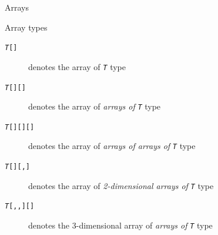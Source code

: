 \documentclass[presentation]{beamer}
\begin{document}
\begin{frame}{\dotnet Arrays}
    \begin{block}{Array types}
        \begin{description}
            \item[\texttt{\textit{T}\alert{[]}}] denotes the \alert{array of \texttt{\textit{T}}} type
            \item[\texttt{\textit{T}\alert{[][]}}] denotes the \alert{array of \emph{arrays of} \texttt{\textit{T}}} type
            \item[\texttt{\textit{T}\alert{[][][]}}] denotes the \alert{array of \emph{arrays of arrays of} \texttt{\textit{T}}} type
            \item[\texttt{\textit{T}\alert{[][,]}}] denotes the \alert{array of \emph{2-dimensional arrays of} \texttt{\textit{T}}} type
            \item[\texttt{\textit{T}\alert{[,,][]}}] denotes the \alert{3-dimensional array of \emph{arrays of} \texttt{\textit{T}}} type
        \end{description}
    \end{block}
\end{frame}
\end{document}
